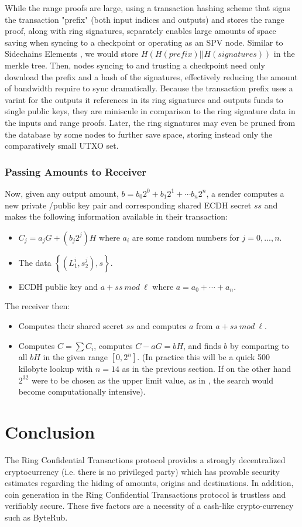 \documentclass[12pt,oneside,english]{amsart}
\numberwithin{equation}{section}
\numberwithin{figure}{section}
\theoremstyle{plain}
\theoremstyle{plain}
\theoremstyle{remark}
\theoremstyle{plain}
\theoremstyle{remark}
\theoremstyle{remark}
\theoremstyle{plain}
\theoremstyle{definition}
\begin{document}
While the range proofs are large, using a transaction hashing scheme that signs the transaction "prefix" (both input indices and outputs) and stores the range proof, along with ring signatures, separately enables large amounts of space saving when syncing to a checkpoint or operating as an SPV node. Similar to Sidechains Elements \cite{El}, we would store 
$H(H(prefix) || H(signatures))$ in the merkle tree. Then, nodes syncing to and trusting a checkpoint need only download the prefix and a hash of the signatures, effectively reducing the amount of bandwidth require to sync dramatically. Because the transaction prefix uses a varint for the outputs it references in its ring signatures and outputs funds to single public keys, they are miniscule in comparison to the ring signature data in the inputs and range proofs. Later, the ring signatures may even be pruned from the database by some nodes to further save space, storing instead only the comparatively small UTXO set.
\subsubsection{Passing Amounts to Receiver}
Now, given any output amount, $b = b_0 2^0 + b_1 2^1 + \cdots b_n 2^n $, a sender computes a new private /public key pair and corresponding shared ECDH secret $ss$ and makes the following information available in their transaction:
\begin{itemize}
 \item $C_j = a_j G + (b_j 2^j) H$ where $a_i$ are some random numbers for $j=0,...,n$.
 \item The data $\left\{(L_1^i, s_2^j),s\right\}$. 
 \item ECDH public key and $a + ss\ mod\ \ell$ where $a = a_0 + \cdots + a_n$. 
\end{itemize}
The receiver then:
\begin{itemize}
 \item Computes their shared secret $ss$ and computes $a$ from $a + ss\ mod\ \ell$. 
 \item Computes $C = \sum C_i$, computes $C - aG = bH$, and finds $b$ by comparing to all $bH$ in the given range $[0, 2^n]$. (In practice this will be a quick 500 kilobyte lookup with $n = 14$ as in the previous section. If on the other hand $2^{32}$ were to be chosen as the upper limit value, as in \cite{GM}, the search would become computationally intensive). 
\end{itemize}


\section{Conclusion}
The Ring Confidential Transactions protocol provides a strongly decentralized cryptocurrency (i.e. there is no privileged party) which has provable security estimates regarding the hiding of amounts, origins and destinations. In addition, coin generation in the Ring Confidential Transactions protocol is trustless and verifiably secure. These five factors are a necessity of a cash-like crypto-currency such as ByteRub. 
\end{document}
